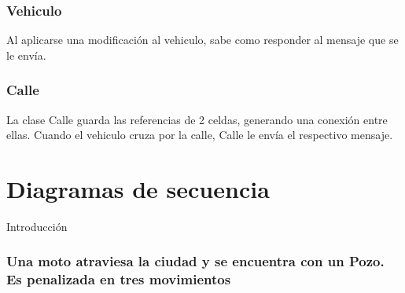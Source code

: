\documentclass[titlepage,a4paper]{article}
\begin{document}
\subsubsection[Vehiculo]{Vehiculo}

Al aplicarse una modificación al vehiculo, sabe como responder al mensaje que se le envía.


\subsubsection[Calle]{Calle}

La clase Calle guarda las referencias de 2 celdas, generando una conexión entre ellas. Cuando el vehiculo cruza por la calle, Calle le envía el respectivo mensaje.




\section{Diagramas de secuencia}\label{sec:diagramasdesecuencia}

Introducción


\subsubsection[Una moto atraviesa la ciudad y se encuentra con un Pozo. Es penalizada en tres movimientos]{Una moto atraviesa la ciudad y se encuentra con un Pozo. Es penalizada en tres movimientos}
\end{document}
